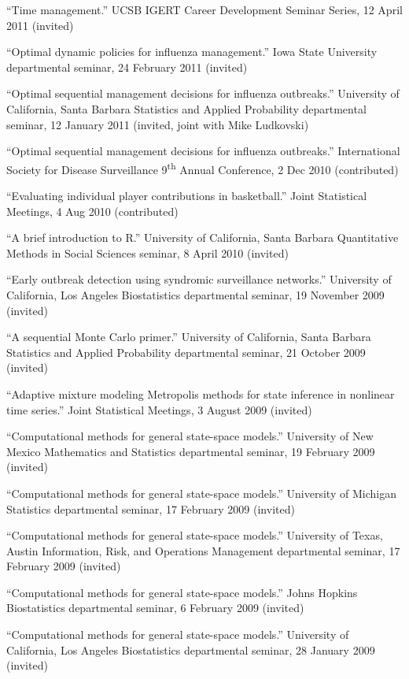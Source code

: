 \documentclass[overlapped,line]{res}
\begin{document}
\begin{resume}
{``Time management.'' UCSB IGERT Career Development Seminar Series, 12 April 2011 (invited)

``Optimal dynamic policies for influenza management.'' Iowa State University departmental seminar, 24 February 2011 (invited)

``Optimal sequential management decisions for influenza outbreaks.'' University of California, Santa Barbara Statistics and Applied Probability departmental seminar, 12 January 2011 (invited, joint with Mike Ludkovski)

``Optimal sequential management decisions for influenza outbreaks.'' International Society for Disease Surveillance 9\textsuperscript{th} Annual Conference, 2 Dec 2010 (contributed)

``Evaluating individual player contributions in basketball.'' Joint Statistical Meetings, 4 Aug 2010 (contributed)

``A brief introduction to R.'' University of California, Santa Barbara Quantitative Methods in Social Sciences seminar, 8 April 2010 (invited)

``Early outbreak detection using syndromic surveillance networks.'' University of California, Los Angeles Biostatistics departmental seminar, 19 November 2009 (invited)

``A sequential Monte Carlo primer.'' University of California, Santa Barbara Statistics and Applied Probability departmental seminar, 21 October 2009 (invited)

``Adaptive mixture modeling Metropolis methods for state inference in nonlinear time series.'' Joint Statistical Meetings, 3 August 2009 (invited)

``Computational methods for general state-space models.'' University of New Mexico Mathematics and Statistics departmental seminar, 19 February 2009 (invited)

``Computational methods for general state-space models.'' University of Michigan Statistics departmental seminar, 17 February 2009 (invited)

``Computational methods for general state-space models.'' University of Texas, Austin Information, Risk, and Operations Management departmental seminar, 17 February 2009 (invited)

``Computational methods for general state-space models.'' Johns Hopkins Biostatistics departmental seminar, 6 February 2009 (invited)

``Computational methods for general state-space models.'' University of California, Los Angeles Biostatistics departmental seminar, 28 January 2009 (invited)

}
\end{resume}
\end{document}
